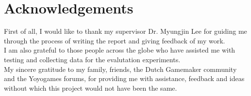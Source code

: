 \documentclass[bsc, 12pt, twoside, singlespacing, parskip, abbrevs, notimes, normalheadings, logo, deptreport]{styles/infthesis}
\begin{document}


\pagebreak
\section*{Acknowledgements}
First of all, I would like to thank my supervisor Dr. Myungjin Lee for guiding me through the process of writing the report and giving feedback of my work.\\
I am also grateful to those people across the globe who have assisted me with testing and collecting data for the evalutation experiments.\\
My sincere gratitude to my family, friends, the Dutch Gamemaker community and the Yoyogames forums, for providing me with assistance, feedback and ideas without which this project would not have been the same.


\vspace{43em}
\end{document}
